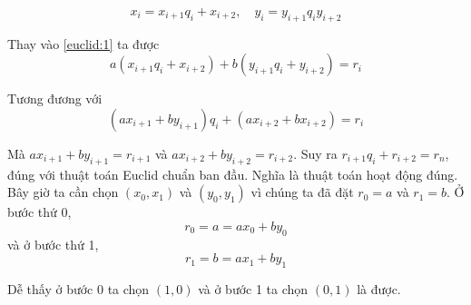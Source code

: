 \begin{equation}
    x_i = x_{i+1} q_i + x_{i+2}, \quad y_i = y_{i+1} q_i y_{i+2}
\end{equation}

Thay vào \ref{euclid:1} ta được
\begin{equation}
    a (x_{i+1} q_i + x_{i+2}) + b (y_{i+1} q_i + y_{i+2}) = r_i
\end{equation}

Tương đương với
\[(a x_{i+1} + b y_{i+1}) q_i + (a x_{i+2} + b x_{i+2}) = r_i\]

Mà $a x_{i+1} + b y_{i+1} = r_{i+1}$ và $a x_{i+2} + b y_{i+2}
= r_{i+2}$. Suy ra $r_{i+1} q_i + r_{i+2} = r_n$, đúng với thuật toán
Euclid chuẩn ban đầu. Nghĩa là thuật toán hoạt động đúng.
Bây giờ ta cần chọn $(x_0, x_1)$ và $(y_0, y_1)$ vì chúng ta
đã đặt $r_0 = a$ và $r_1 = b$. Ở bước thứ 0,
\[r_0 = a = a x_0 + b y_0\]
và ở bước thứ 1,
\[r_1 = b = a x_1 + b y_1\]

Dễ thấy ở bước 0 ta chọn $(1, 0)$ và ở bước 1 ta chọn $(0, 1)$ là được.